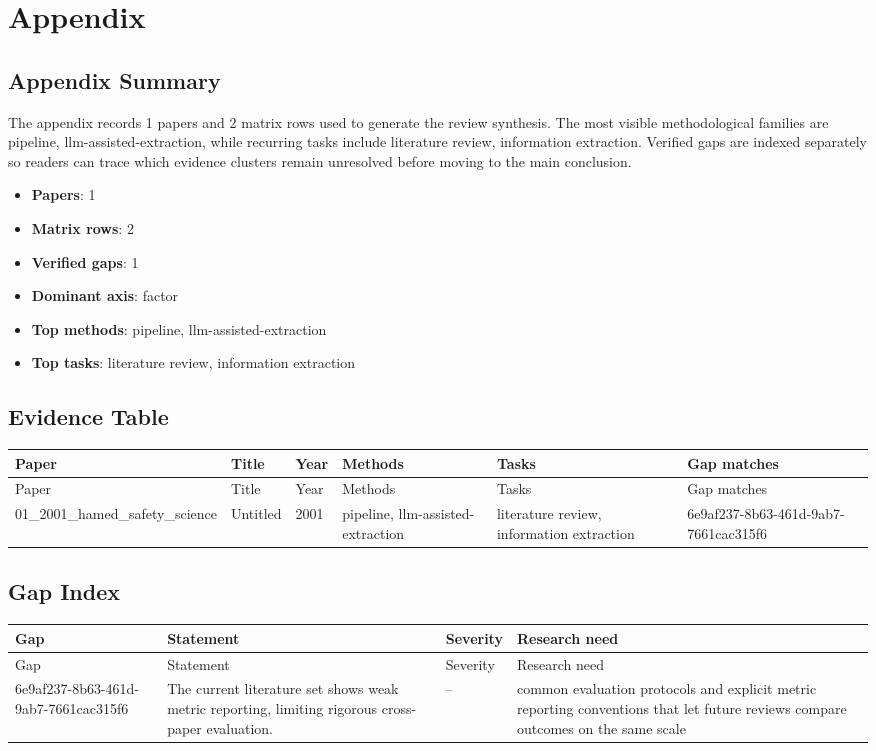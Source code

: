 \documentclass{article}
\begin{document}
\appendix
\section{Appendix}
\subsection{Appendix Summary}
\noindent The appendix records 1 papers and 2 matrix rows used to generate the review synthesis. The most visible methodological families are pipeline, llm-assisted-extraction, while recurring tasks include literature review, information extraction. Verified gaps are indexed separately so readers can trace which evidence clusters remain unresolved before moving to the main conclusion.

\begin{itemize}
\item \textbf{Papers}: 1
\item \textbf{Matrix rows}: 2
\item \textbf{Verified gaps}: 1
\item \textbf{Dominant axis}: factor
\item \textbf{Top methods}: pipeline, llm-assisted-extraction
\item \textbf{Top tasks}: literature review, information extraction
\end{itemize}

\subsection{Evidence Table}
\begin{longtable}{p{}p{}p{}p{}p{}p{}}
\toprule
Paper & Title & Year & Methods & Tasks & Gap matches \\
\midrule
\endfirsthead
\toprule
Paper & Title & Year & Methods & Tasks & Gap matches \\
\midrule
\endhead
01\_2001\_hamed\_safety\_science & Untitled & 2001 & pipeline, llm-assisted-extraction & literature review, information extraction & 6e9af237-8b63-461d-9ab7-7661cac315f6 \\
\bottomrule
\end{longtable}

\subsection{Gap Index}
\begin{longtable}{p{}p{}p{}p{}}
\toprule
Gap & Statement & Severity & Research need \\
\midrule
\endfirsthead
\toprule
Gap & Statement & Severity & Research need \\
\midrule
\endhead
6e9af237-8b63-461d-9ab7-7661cac315f6 & The current literature set shows weak metric reporting, limiting rigorous cross-paper evaluation. & -- & common evaluation protocols and explicit metric reporting conventions that let future reviews compare outcomes on the same scale \\
\bottomrule
\end{longtable}
\end{document}
